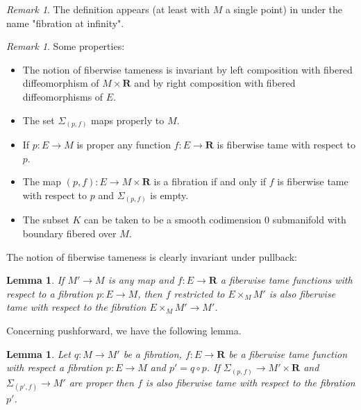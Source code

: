 \documentclass[12pt,a4paper]{article}
\numberwithin{equation}{section}
\newtheorem{lem}[equation]{Lemma}
\theoremstyle{definition}
\theoremstyle{remark}
\newtheorem{rem}[equation]{Remark}
\newcommand{\R}{\mathbf{R}}
\begin{document}
\begin{rem}
The definition appears (at least with $M$ a single point) in \cite{Eliashberg-Gromov}
under the name "fibration at infinity".
\end{rem}

\begin{rem}
Some properties:
\begin{itemize}
\item The notion of fiberwise tameness is invariant by left composition with fibered diffeomorphism of $M\times \R$ and by right composition with fibered diffeomorphisms of $E$.
\item The set $\Sigma_{(p,f)}$ maps properly to $M$.
\item If $p:E\to M$ is proper any function $f:E\to \R$ is fiberwise tame with respect to $p$.
\item The map $(p,f):E\to M\times \R$ is a fibration if and only if $f$ is fiberwise tame with respect to $p$ and $\Sigma_{(p,f)}$ is empty.
\item The subset $K$ can be taken to be a smooth codimension $0$ submanifold with boundary fibered over $M$.
\end{itemize}
\end{rem}

The notion of fiberwise tameness is clearly invariant under pullback:
\begin{lem}\label{lem:tamepullback}
If $M'\to M$ is any map and $f:E\to \R$ a fiberwise tame functions with respect to a fibration $p:E\to M$, then $f$ restricted to
$E\times_M M'$ is also fiberwise tame with respect to the fibration $E\times_M M'\to M'$.
\end{lem}

Concerning pushforward, we have the following lemma.
\begin{lem}\label{lem:tamepushforward}
Let $q:M\to M'$ be a fibration, $f:E\to \R$ be a fiberwise tame function with respect a fibration $p:E\to M$ and $p'=q\circ p$.
If $\Sigma_{(p,f)} \to M'\times \R$ and $\Sigma_{(p',f)}\to M'$ are proper then $f$ is also fiberwise tame with respect to the fibration $p'$.
\end{lem}
\end{document}
